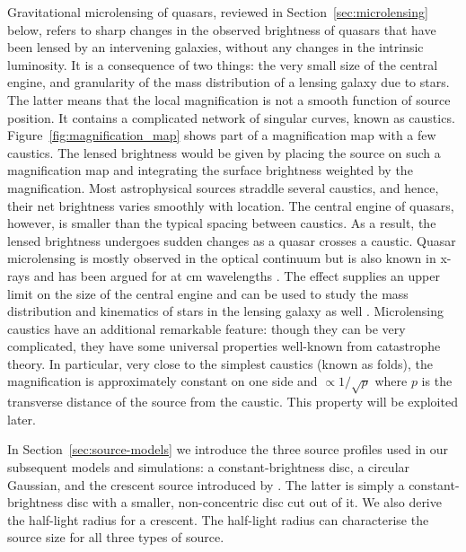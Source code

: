 \documentclass[usenatbib]{mn2e}
\begin{document}
Gravitational microlensing of quasars, reviewed in
Section~\ref{sec:microlensing} below, refers to sharp changes in the
observed brightness of quasars that have been lensed by an intervening
galaxies, without any changes in the intrinsic luminosity.  It is a
consequence of two things: the very small size of the central engine,
and granularity of the mass distribution of a lensing galaxy due to
stars.  The latter means that the local magnification is not a smooth
function of source position. It contains a complicated network of
singular curves, known as caustics.
Figure~\ref{fig:magnification_map} shows part of a magnification map
with a few caustics.  The lensed brightness would be given by placing
the source on such a magnification map and integrating the surface
brightness weighted by the magnification.  Most astrophysical sources
straddle several caustics, and hence, their net brightness varies
smoothly with location.  The central engine of quasars, however, is
smaller than the typical spacing between caustics.  As a result, the
lensed brightness undergoes sudden changes as a quasar crosses a
caustic.  Quasar microlensing is mostly observed in the optical
continuum \citep[e.g.,][]{2012A&A...544A..62S} but is also known in
x-rays \citep[e.g.,][]{2016arXiv160207601N} and has been argued for at
cm wavelengths \citep{2000A&A...358..793K}.  The effect supplies an
upper limit on the size of the central engine
\citep[e.g.,][]{2015ApJ...814L..26M} and can be used to study the mass
distribution and kinematics of stars in the lensing galaxy as well
\citep[e.g.,][]{2012ApJ...744..111P}.  Microlensing caustics have an
additional remarkable feature: though they can be very complicated,
they have some universal properties well-known from catastrophe
theory.  In particular, very close to the simplest caustics (known as
folds), the magnification is approximately constant on one side and
$\propto1/\sqrt p$ where $p$ is the transverse distance of the source
from the caustic.  This property will be exploited later.

In Section~\ref{sec:source-models} we introduce the three source
profiles used in our subsequent models and simulations: a
constant-brightness disc, a circular Gaussian, and the crescent source
introduced by \citep{2013MNRAS.434..765K}.  The latter is simply a
constant-brightness disc with a smaller, non-concentric disc cut out
of it.  We also derive the half-light radius for a crescent.  The
half-light radius can characterise the source size for all three types
of source.
\end{document}
